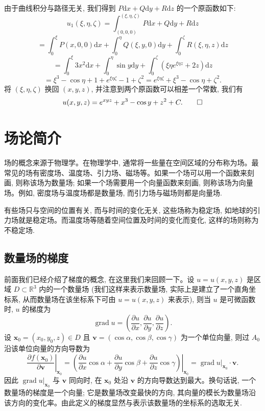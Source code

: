 \begin{solve}
由于曲线积分与路径无关, 我们得到 $P\mathrm dx+Q\mathrm dy+R\mathrm dz$ 的一个原函数如下:
\[
  u_1(\xi,\eta,\zeta)
  =\int_{(0,0,0)}^{(\xi,\eta,\zeta)}P\mathrm dx+Q\mathrm dy+R\mathrm dz
\]
\[
  =\int_0^\xi P(x,0,0)\mathrm dx
  +\int_0^\eta Q(\xi,y,0)\mathrm dy
  +\int_0^\zeta R(\xi,\eta,z)\mathrm dz
\]
\[
  =\int_0^\xi 3x^2\mathrm dx+\int_0^\eta\sin y\mathrm dy
  +\int_0^\zeta(\xi\eta e^{\xi\eta z}+2z)\mathrm dz
\]
\[
  =\xi^3-\cos\eta+1+e^{\xi\eta\zeta}-1+\zeta^2
  =e^{\xi\eta\zeta}+\xi^3-\cos\eta+\zeta^2.
\]
将 $(\xi,\eta,\zeta)$ 换回 $(x,y,z)$, 并注意到两个原函数可以相差一个常数, 我们有
\[
  u(x,y,z)=e^{xyz}+x^3-\cos y+z^2+C.
\qedhere
\]
\end{solve}


\section{场论简介}
\label{sec:ma-16-8}

场的概念来源于物理学。在物理学中, 通常将一些量在空间区域的分布称为场。最常见的场有密度场、温度场、引力场、磁场等。如果一个场可以用一个函数来刻画, 则称该场为数量场; 如果一个场需要用一个向量函数来刻画, 则称该场为向量场。例如, 密度场与温度场都是数量场, 而引力场与磁场则都是向量场.

有些场只与空间的位置有关, 而与时间的变化无关, 这些场称为稳定场, 如地球的引力场就是稳定场。而温度场等随着空间位置及时间的变化而变化, 这样的场则称为不稳定场.

\subsection{数量场的梯度}
\label{subsec:ma-16-8-1}

前面我们已经介绍了梯度的概念, 在这里我们来回顾一下。设 $u=u(x,y,z)$ 是区域 $D\subset\mathbb R^3$ 内的一个数量场 (我们这样来表示数量场, 实际上是建立了一个直角坐标系, 从而数量场在该坐标系下可由 $u=u(x,y,z)$ 来表示), 则当 $u$ 是可微函数时, $u$ 的梯度为
\[
  \operatorname{grad}u=
  \left(\frac{\partial u}{\partial x},\frac{\partial u}{\partial y},\frac{\partial u}{\partial z}\right).
\]
设 $\boldsymbol x_0=(x_0,y_0,z)\in D$ 且 $\boldsymbol v=(\cos\alpha,\cos\beta,\cos\gamma)$ 为一个单位向量, 则过 $A_0$ 沿该单位向量的方向导数为
\[
  \left.\frac{\partial f(\boldsymbol x_0)}{\partial\boldsymbol v}\right|_{\boldsymbol x_0}
  =
  \left.\left(\frac{\partial u}{\partial x}\cos\alpha+\frac{\partial u}{\partial y}\cos\beta+\frac{\partial u}{\partial z}\cos\gamma\right)\right|_{\boldsymbol x_0}
  =
  \left.\operatorname{grad}u\right|_{\boldsymbol x_0}\cdot\boldsymbol v.
\]
因此 $\left.\operatorname{grad}u\right|_{\boldsymbol x_0}$ 与 $\boldsymbol v$ 同向时, 在 $\boldsymbol x_0$ 处沿 $\boldsymbol v$ 的方向导数达到最大。换句话说, 一个数量场的梯度是一个向量; 它是数量场改变最快的方向, 其向量的模长为数量场沿该方向的变化率。由此定义的梯度显然与表示该数量场的坐标系的选取无关.

